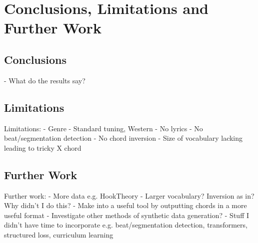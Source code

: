 
\chapter{Conclusions, Limitations and Further Work}

\section{Conclusions}

- What do the results say?

\section{Limitations}
Limitations:
- Genre
- Standard tuning, Western
- No lyrics
- No beat/segmentation detection
- No chord inversion
- Size of vocabulary lacking leading to tricky X chord

\section{Further Work}
Further work:
- More data e.g. HookTheory
- Larger vocabulary? Inversion as in? Why didn't I do this?
- Make into a useful tool by outputting chords in a more useful format
- Investigate other methods of synthetic data generation?
- Stuff I didn't have time to incorporate e.g. beat/segmentation detection, transformers, structured loss, curriculum learning